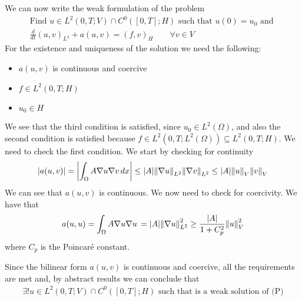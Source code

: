 We can now write the weak formulation of the problem
\[
    \begin{split}
        \text{Find } u \in L^2(0, T; V) \cap C^0([0, T]; H) \text{ such that } u(0) = u_0 \text{ and }\\
        \frac{d}{dt} (u, v)_{L^2} + a(u, v) = (f, v)_{H} \qquad \forall v \in V
    \end{split}
\]
For the existence and uniqueness of the solution we need the following:
\begin{itemize}
    \item \(a(u, v)\) is continuous and coercive
    \item \(f \in L^2(0, T; H)\)
    \item \(u_0 \in H\)
\end{itemize}
We see that the third condition is satisfied, since \(u_0 \in L^2(\Omega)\), and also the second condition is satisfied because \(f \in L^2(0, T; L^2(\Omega)) \subseteq L^2(0, T; H)\). We need to check the first condition. We start by checking for continuity
\[
    \begin{split}
        \abs{a(u, v)} = \abs{\int_\Omega A \nabla u \nabla v \, dx} \leq \abs{A} \norm{\nabla u}_{L^2} \norm{\nabla v}_{L^2} \leq \abs{A} \norm{u}_{V} \norm{v}_{V} 
    \end{split}
\]
We can see that \(a(u, v)\) is continuous. We now need to check for coercivity. We have that
\[
    \begin{split}
        a(u, u) = \int_\Omega A \nabla u \nabla u \, = \abs{A} \norm{\nabla u}_{L^2}^2 \geq \frac{\abs{A}}{1 + C_p^2} \norm{u}_{V}^2
    \end{split}
\]
where \(C_p\) is the Poincaré constant.

Since the bilinear form \(a(u, v)\) is continuous and coercive, all the requirements are met and, by abstract results we can conclude that
\[
    \begin{split}
        \exists! u \in L^2(0, T; V) \cap C^0([0, T]; H) \text{ such that is a weak solution of (P)}
    \end{split}
\]

